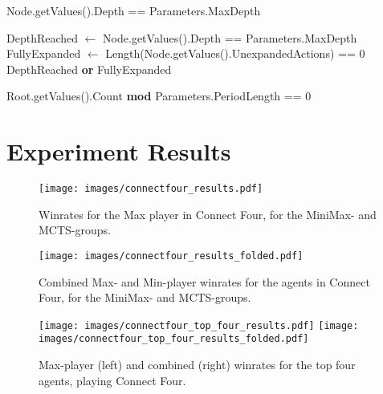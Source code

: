 \begin{algorithm}[H]
    \begin{algorithmic}[1]
            \State \Return Node.getValues().Depth == Parameters.MaxDepth 
        \EndProcedure
    \end{algorithmic}    
\end{algorithm}

\begin{algorithm}[H]
    \begin{algorithmic}[1]
            \State DepthReached $\gets$ Node.getValues().Depth == Parameters.MaxDepth
            \State FullyExpanded $\gets$ Length(Node.getValues().UnexpandedActions) == 0
            \State \Return DepthReached \textbf{or} FullyExpanded
        \EndProcedure
    \end{algorithmic}    
\end{algorithm}

\begin{algorithm}[H]
    \begin{algorithmic}[1]
            \State \Return Root.getValues().Count \textbf{mod} Parameters.PeriodLength == 0
        \EndProcedure
    \end{algorithmic}    
\end{algorithm}

\newpage
\section{Experiment Results}
\label{appendix:results}

\begin{figure}[H]
    \centering
    \texttt{[image: images/connectfour\_results.pdf]}
    \caption{Winrates for the Max player in Connect Four, for the MiniMax- and MCTS-groups.}
    \label{fig:c4_results}
\end{figure}

\begin{figure}[H]
    \centering
    \texttt{[image: images/connectfour\_results\_folded.pdf]}
    \caption{Combined Max- and Min-player winrates for the agents in Connect Four, for the MiniMax- and MCTS-groups.}
    \label{fig:c4_results_folded}
\end{figure}

\begin{figure}[H]
    \centering
    \texttt{[image: images/connectfour\_top\_four\_results.pdf]}
    \texttt{[image: images/connectfour\_top\_four\_results\_folded.pdf]}
    \caption{Max-player (left) and combined (right) winrates for the top four agents, playing Connect Four.}
    \label{fig:c4_top_four_results}
\end{figure}

